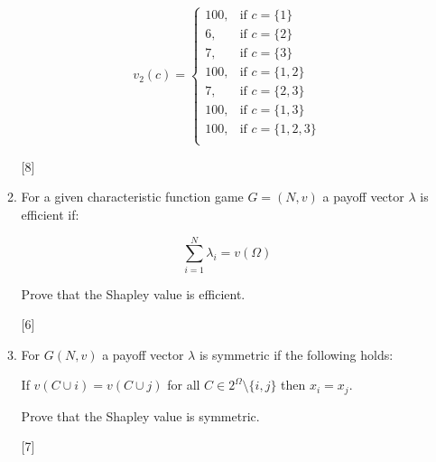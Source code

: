 \documentclass[12pt,a4paper]{article}
\makeatletter
\renewcommand{\@oddfoot}{\hfil \arabic{page} \hfil}    %
\makeatother
\begin{document}
\begin{enumerate}
\begin{enumerate}
            \[
                v_2(c) = \begin{cases}
                    100,& \text{if }c=\{1\}\\
                    6,& \text{if } c=\{2\}\\
                    7,& \text{if } c=\{3\}\\
                    100,& \text{if } c=\{1,2\}\\
                    7,& \text{if } c=\{2,3\}\\
                    100,& \text{if } c=\{1,3\}\\
                    100,& \text{if } c=\{1,2,3\}\\
                \end{cases}
            \]

        \hfill{[8]}

        \item  For a given characteristic function game \(G=(N,v)\) a payoff vector \(\lambda\) is efficient if:

            \[\sum_{i=1}^{N}\lambda_i=v(\Omega)\]

            Prove that the Shapley value is efficient.

        \hfill{[6]}

        \item For \(G(N,v)\) a payoff vector \(\lambda\) is symmetric if the following holds:

        If \(v(C\cup i)=v(C\cup j)\) for all \(C\in 2^{\Omega}\setminus\{i,j\}\) then \(x_i=x_j\).

        Prove that the Shapley value is symmetric.

        \hfill{[7]}

    \end{enumerate}


\end{enumerate}

\makeatletter
\renewcommand{\@oddfoot}{\hfil \arabic{page}X \hfil}    %
\makeatother
\end{document}
